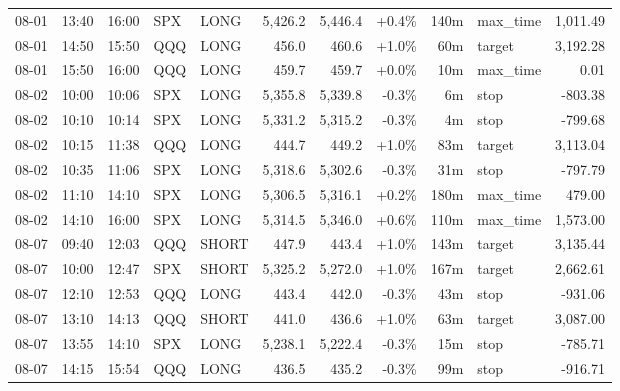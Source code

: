 \documentclass[11pt,a4paper,twoside]{article}
\begin{document}
\begin{center}
\begin{longtable}{>{\color{txtmain}}l l l l l r r r r >{\color{txtmain}}l r}
08-01 & 13:40 & 16:00 & SPX & LONG & 5,426.2 & 5,446.4 & \textcolor{wingreen}{+0.4\%} & 140m & max\_time & \textcolor{wingreen}{1,011.49} \\
08-01 & 14:50 & 15:50 & QQQ & LONG & 456.0 & 460.6 & \textcolor{wingreen}{+1.0\%} & 60m & target & \textcolor{wingreen}{3,192.28} \\
08-01 & 15:50 & 16:00 & QQQ & LONG & 459.7 & 459.7 & \textcolor{wingreen}{+0.0\%} & 10m & max\_time & \textcolor{wingreen}{0.01} \\
08-02 & 10:00 & 10:06 & SPX & LONG & 5,355.8 & 5,339.8 & \textcolor{lossred}{-0.3\%} & 6m & stop & \textcolor{lossred}{-803.38} \\
08-02 & 10:10 & 10:14 & SPX & LONG & 5,331.2 & 5,315.2 & \textcolor{lossred}{-0.3\%} & 4m & stop & \textcolor{lossred}{-799.68} \\
08-02 & 10:15 & 11:38 & QQQ & LONG & 444.7 & 449.2 & \textcolor{wingreen}{+1.0\%} & 83m & target & \textcolor{wingreen}{3,113.04} \\
08-02 & 10:35 & 11:06 & SPX & LONG & 5,318.6 & 5,302.6 & \textcolor{lossred}{-0.3\%} & 31m & stop & \textcolor{lossred}{-797.79} \\
08-02 & 11:10 & 14:10 & SPX & LONG & 5,306.5 & 5,316.1 & \textcolor{wingreen}{+0.2\%} & 180m & max\_time & \textcolor{wingreen}{479.00} \\
08-02 & 14:10 & 16:00 & SPX & LONG & 5,314.5 & 5,346.0 & \textcolor{wingreen}{+0.6\%} & 110m & max\_time & \textcolor{wingreen}{1,573.00} \\
08-07 & 09:40 & 12:03 & QQQ & SHORT & 447.9 & 443.4 & \textcolor{wingreen}{+1.0\%} & 143m & target & \textcolor{wingreen}{3,135.44} \\
08-07 & 10:00 & 12:47 & SPX & SHORT & 5,325.2 & 5,272.0 & \textcolor{wingreen}{+1.0\%} & 167m & target & \textcolor{wingreen}{2,662.61} \\
08-07 & 12:10 & 12:53 & QQQ & LONG & 443.4 & 442.0 & \textcolor{lossred}{-0.3\%} & 43m & stop & \textcolor{lossred}{-931.06} \\
08-07 & 13:10 & 14:13 & QQQ & SHORT & 441.0 & 436.6 & \textcolor{wingreen}{+1.0\%} & 63m & target & \textcolor{wingreen}{3,087.00} \\
08-07 & 13:55 & 14:10 & SPX & LONG & 5,238.1 & 5,222.4 & \textcolor{lossred}{-0.3\%} & 15m & stop & \textcolor{lossred}{-785.71} \\
08-07 & 14:15 & 15:54 & QQQ & LONG & 436.5 & 435.2 & \textcolor{lossred}{-0.3\%} & 99m & stop & \textcolor{lossred}{-916.71} \\

\end{longtable}
\end{center}
\end{document}
